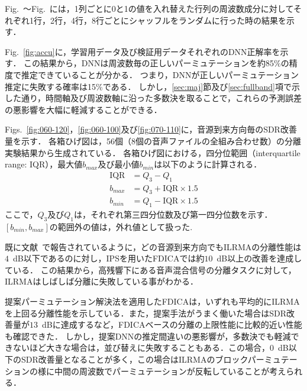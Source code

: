 Fig.~〜Fig.~には，1列ごとに0と1の値を入れ替えた行列の周波数成分に対してそれぞれ1行，2行，4行，8行ごとにシャッフルをランダムに行った時の結果を示す．




Fig.~\ref{fig:accu}に，学習用データ及び検証用データそれぞれのDNN正解率を示す．
この結果から，DNNは周波数毎の正しいパーミュテーションを約85\%の精度で推定できていることが分かる．
つまり，DNNが正しいパーミュテーション推定に失敗する確率は15\%である．
しかし，\ref{sec:maj}節及び\ref{sec:fullband}項で示した通り，時間軸及び周波数軸に沿った多数決を取ることで，これらの予測誤差の悪影響を大幅に軽減することができる．

Figs.~\ref{fig:060-120}，\ref{fig:060-100}及び\ref{fig:070-110}に，音源到来方向毎のSDR改善量を示す．
各箱ひげ図は，56個（8個の音声ファイルの全組み合わせ数）の分離実験結果から生成されている．
各箱ひげ図における，四分位範囲（interquartile range: IQR），最大値$b_{max}$及び最小値$b_{min}$は以下のように計算される．
\begin{align}
 \mbox{IQR} &= Q_3 - Q_1 \\
  b_{max} &=   Q_3 +\mbox{IQR} \times 1.5\\
  b_{min} &=   Q_1 -\mbox{IQR} \times 1.5
\end{align}
ここで，$Q_3$及び$Q_1$は，それぞれ第三四分位数及び第一四分位数を示す．
$[b_{min}, b_{max}]$の範囲外の値は，外れ値として扱った.

既に文献~\cite{EU}で報告されているように，どの音源到来方向でもILRMAの分離性能は$4$~dB以下であるのに対し，IPSを用いたFDICAでは約$10$~dB以上の改善を達成している．
この結果から，高残響下にある音声混合信号の分離タスクに対して，ILRMAはしばしば分離に失敗している事がわかる．

提案パーミュテーション解決法を適用したFDICAは，いずれも平均的にILRMAを上回る分離性能を示している．また，提案手法がうまく働いた場合はSDR改善量が$13$~dBに達成するなど，FDICAベースの分離の上限性能に比較的近い性能も確認できた．
しかし，提案DNNの推定間違いの悪影響が，多数決でも軽減できないほど大きな場合は，並び替えに失敗することもある．この場合，$0$~dB以下のSDR改善量となることが多く，この場合はILRMAのブロックパーミュテーションの様に中間の周波数でパーミュテーションが反転していることが考えられる．

